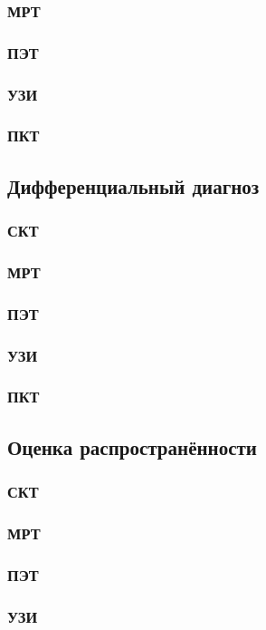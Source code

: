 \subsubsection{МРТ}
\subsubsection{ПЭТ}
\subsubsection{УЗИ}
\subsubsection{ПКТ}
\subsection{Дифференциальный диагноз}
\subsubsection{СКТ}
\subsubsection{МРТ}
\subsubsection{ПЭТ}
\subsubsection{УЗИ}
\subsubsection{ПКТ}
\subsection{Оценка распространённости}
\subsubsection{СКТ}
\subsubsection{МРТ}
\subsubsection{ПЭТ}
\subsubsection{УЗИ}
